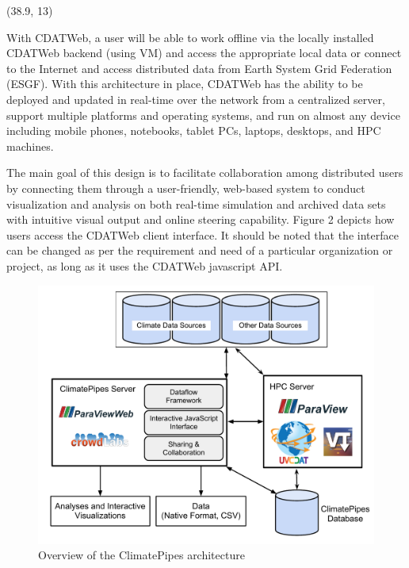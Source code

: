 \documentclass[a0,landscape]{a0poster}
\newenvironment{pcol}[1]{
  \begin{minipage}[t]{#1}
}{
  \end{minipage}
}
\begin{document}
\begin{textblock}{35}(38.9, 13)
\begin{pcol}{\threecolwidth}

With CDATWeb, a user will be able to work offline via the locally installed CDATWeb backend (using VM) and access the appropriate local data or connect to the Internet and access distributed data from Earth System Grid Federation (ESGF). With this architecture in place, CDATWeb has the ability to be deployed and updated in real-time over the network from a centralized server, support multiple platforms and operating systems, and run on almost any device including mobile phones, notebooks, tablet PCs, laptops, desktops, and HPC machines.

The main goal of this design is to facilitate collaboration among distributed users by connecting them through a user-friendly, web-based system to conduct visualization and analysis on both real-time simulation and archived data sets with intuitive visual output and online steering capability. Figure 2 depicts how users access the CDATWeb client interface. It should be noted that the interface can be changed as per the requirement and need of a particular organization or project, as long as it uses the CDATWeb javascript API.

\begin{figure}[overview]
\includegraphics[height=0.6\hsize]{images/Overview}
\caption{Overview of the ClimatePipes architecture}
\end{figure}

\vspace{1cm}


\end{pcol}
\end{textblock}
\end{document}
